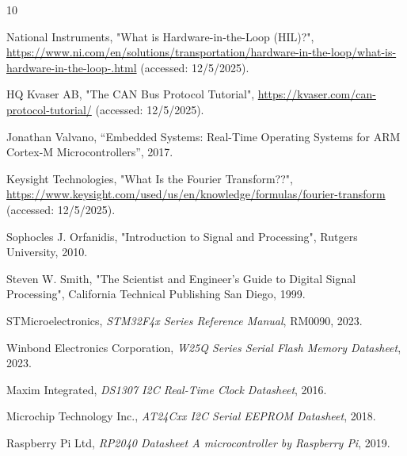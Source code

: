 \sloppy

\begin{thebibliography}{10}

National Instruments, "What is Hardware-in-the-Loop (HIL)?",
\url{https://www.ni.com/en/solutions/transportation/hardware-in-the-loop/what-is-hardware-in-the-loop-.html}
(accessed: 12/5/2025).

HQ Kvaser AB, "The CAN Bus Protocol Tutorial",
\url{https://kvaser.com/can-protocol-tutorial/}
(accessed: 12/5/2025).

Jonathan Valvano, “Embedded Systems: Real-Time Operating Systems for ARM Cortex-M Microcontrollers”, 2017.

Keysight Technologies, "What Is the Fourier Transform??", 
\url{https://www.keysight.com/used/us/en/knowledge/formulas/fourier-transform}
(accessed: 12/5/2025).

Sophocles J. Orfanidis, "Introduction to Signal and Processing", Rutgers University, 2010.

Steven W. Smith, "The Scientist and Engineer's Guide to Digital Signal Processing", California Technical Publishing San Diego, 1999.

STMicroelectronics, \textit{STM32F4x Series Reference Manual}, RM0090, 2023.

Winbond Electronics Corporation, 
\textit{W25Q Series Serial Flash Memory Datasheet}, 2023.

Maxim Integrated, 
\textit{DS1307 I2C Real-Time Clock Datasheet}, 2016.

Microchip Technology Inc., 
\textit{AT24Cxx I2C Serial EEPROM Datasheet}, 2018.

Raspberry Pi Ltd, 
\textit{RP2040 Datasheet A microcontroller by Raspberry Pi}, 2019.

\end{thebibliography}
